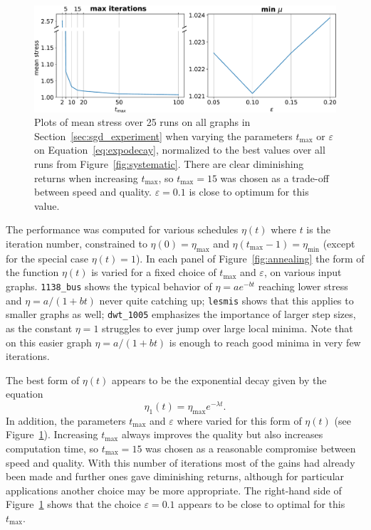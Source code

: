 \begin{figure}
  \centering
  \includegraphics[width=.95\textwidth]{stress/parameters.pdf}
  \caption[A comparison of annealing schedule parameterisations]{Plots of mean stress over 25 runs on all graphs in Section~\ref{sec:sgd_experiment} when varying the parameters $t_{\max}$ or $\varepsilon$ on Equation~\eqref{eq:expodecay}, normalized to the best values over all runs from Figure~\ref{fig:systematic}.
  There are clear diminishing returns when increasing $t_{\max}$, so $t_{\max}=15$ was chosen as a trade-off between speed and quality.
  $\varepsilon=0.1$ is close to optimum for this value.
  }
  \label{fig:parameters}
\end{figure}

The performance was computed for various schedules $\eta(t)$ where $t$ is the iteration number, constrained to $\eta(0)=\eta_{\max}$ and $\eta(t_\mathrm{max}-1)=\eta_{\min}$ (except for the special case $\eta(t)=1$).
In each panel of Figure~\ref{fig:annealing} the form of the function $\eta(t)$ is varied for a fixed choice of $t_\mathrm{max}$ and $\varepsilon$, on various input graphs.
\texttt{1138\_bus} shows the typical behavior of $\eta= ae^{-bt}$ reaching lower stress and $\eta= a/(1+bt)$ never quite catching up; \texttt{lesmis} shows that this applies to smaller graphs as well; \texttt{dwt\_1005} emphasizes the importance of larger step sizes, as the constant $\eta=1$ struggles to ever jump over large local minima. Note that on this easier graph $\eta=a/(1+bt)$ is enough to reach good minima in very few iterations.

The best form of $\eta(t)$ appears to be the exponential decay given by the equation
\begin{equation}
  \eta_1(t) = \eta_{\max} e^{-\lambda t}.
  \label{eq:expodecay}
\end{equation}
In addition, the parameters $t_\mathrm{max}$ and $\varepsilon$ where varied for this form of $\eta(t)$ (see Figure~\ref{fig:parameters}).
Increasing $t_\mathrm{max}$ always improves the quality but also increases computation time, so $t_\mathrm{max}=15$ was chosen as a reasonable compromise between speed and quality.
With this number of iterations most of the gains had already been made and further ones gave diminishing returns, although for particular applications another choice may be more appropriate.
The right-hand side of Figure~\ref{fig:parameters} shows that the choice $\varepsilon=0.1$ appears to be close to optimal for this $t_{\max}$.

